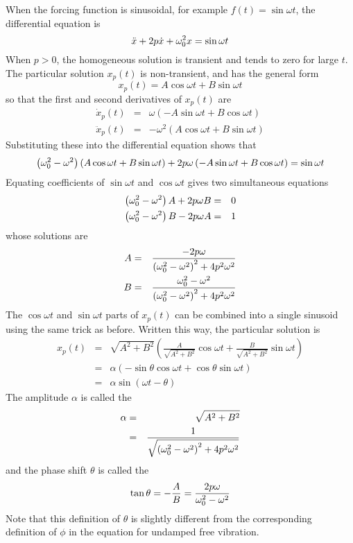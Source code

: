 When the forcing function is sinusoidal, for example $f(t)=\sin\omega t$,
the differential equation is
$$\ddot{x}+2p\dot{x}+\omega_0^2x=\sin\omega t$$
When $p>0$, the homogeneous solution is transient and tends to zero for
large $t$.  The particular solution $x_p(t)$ is non-transient, and has the
general form
$$x_p(t)=A\cos\omega t+B\sin\omega t$$
so that the first and second derivatives of $x_p(t)$ are
\begin{eqnarray*}
\dot{x}_p(t)&=&\omega\left(-A\sin\omega t+B\cos\omega t\right)\\
\ddot{x}_p(t)&=&-\omega^2\left(A\cos\omega t+B\sin\omega t\right)
\end{eqnarray*}
Substituting these into the differential equation shows that
$$\left(\omega_0^2-\omega^2\right)\left(A\cos\omega t+B\sin\omega t\right)
+2p\omega\left(-A\sin\omega t+B\cos\omega t\right)=\sin\omega t$$
Equating coefficients of $\sin\omega t$ and $\cos\omega t$ gives two
simultaneous equations
\begin{eqnarray*}
\left(\omega_0^2-\omega^2\right)A+2p\omega B&=&0 \\
\left(\omega_0^2-\omega^2\right)B-2p\omega A&=&1
\end{eqnarray*}
whose solutions are 
\begin{eqnarray*}
A&=&\frac{-2p\omega}{\left(\omega_0^2-\omega^2\right)^2+4p^2\omega^2} \\
B&=&\frac{\omega_0^2-\omega^2}{\left(\omega_0^2-\omega^2\right)^2+4p^2\omega^2}
\end{eqnarray*}
The $\cos\omega t$ and $\sin\omega t$ parts of $x_p(t)$ can be combined into
a single sinusoid using the same trick as before.
Written this way, the particular solution is
\begin{eqnarray*}
x_p(t)&=&\sqrt{A^2+B^2}\left(
\frac{A}{\sqrt{A^2+B^2}}\cos\omega t +
\frac{B}{\sqrt{A^2+B^2}}\sin\omega t\right)\\
&=&\alpha\left(-\sin\theta\cos\omega t +\cos\theta\sin\omega t\right)\\
&=&\alpha\sin\left(\omega t-\theta\right)
\end{eqnarray*}
The amplitude $\alpha$ is called the 
\begin{eqnarray*}
\alpha&=&\sqrt{A^2+B^2}\\
&=&\frac{1}{\sqrt{\left(\omega_0^2-\omega^2\right)^2+4p^2\omega^2}}
\end{eqnarray*}
and the phase shift $\theta$ is called the 
$$\tan\theta=-\frac{A}{B}=\frac{2p\omega}{\omega_0^2-\omega^2}$$
Note that this definition of $\theta$ is slightly different from the
corresponding definition of $\phi$ in the equation for
undamped free vibration.

